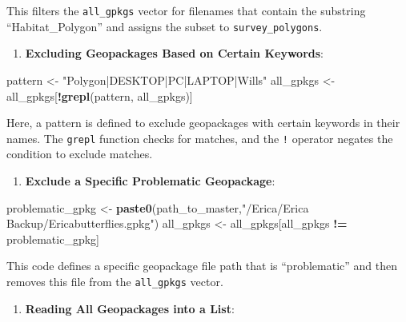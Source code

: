 \documentclass[
]{book}
\newenvironment{Shaded}{\begin{snugshade}}{\end{snugshade}}
\newcommand{\FunctionTok}[1]{\textcolor[rgb]{0.13,0.29,0.53}{\textbf{#1}}}
\newcommand{\NormalTok}[1]{#1}
\newcommand{\OtherTok}[1]{\textcolor[rgb]{0.56,0.35,0.01}{#1}}
\newcommand{\SpecialCharTok}[1]{\textcolor[rgb]{0.81,0.36,0.00}{\textbf{#1}}}
\newcommand{\StringTok}[1]{\textcolor[rgb]{0.31,0.60,0.02}{#1}}
\providecommand{\tightlist}{%
  \setlength{\itemsep}{0pt}\setlength{\parskip}{0pt}}
\theoremstyle{definition}
\theoremstyle{definition}
\theoremstyle{definition}
\theoremstyle{definition}
\theoremstyle{remark}
\begin{document}
This filters the \texttt{all\_gpkgs} vector for filenames that contain the substring ``Habitat\_Polygon'' and assigns the subset to \texttt{survey\_polygons}.

\begin{enumerate}
\def\labelenumi{\arabic{enumi}.}
\setcounter{enumi}{3}
\tightlist
\item
  \textbf{Excluding Geopackages Based on Certain Keywords}:
\end{enumerate}

\begin{Shaded}
\begin{Highlighting}[]
\NormalTok{   pattern }\OtherTok{\textless{}{-}} \StringTok{"Polygon|DESKTOP|PC|LAPTOP|Wills"}
\NormalTok{   all\_gpkgs }\OtherTok{\textless{}{-}}\NormalTok{ all\_gpkgs[}\SpecialCharTok{!}\FunctionTok{grepl}\NormalTok{(pattern, all\_gpkgs)]}
\end{Highlighting}
\end{Shaded}

Here, a pattern is defined to exclude geopackages with certain keywords in their names. The \texttt{grepl} function checks for matches, and the \texttt{!} operator negates the condition to exclude matches.

\begin{enumerate}
\def\labelenumi{\arabic{enumi}.}
\setcounter{enumi}{4}
\tightlist
\item
  \textbf{Exclude a Specific Problematic Geopackage}:
\end{enumerate}

\begin{Shaded}
\begin{Highlighting}[]
\NormalTok{   problematic\_gpkg }\OtherTok{\textless{}{-}} \FunctionTok{paste0}\NormalTok{(path\_to\_master,}\StringTok{"/Erica/Erica Backup/Ericabutterflies.gpkg"}\NormalTok{)}
\NormalTok{   all\_gpkgs }\OtherTok{\textless{}{-}}\NormalTok{ all\_gpkgs[all\_gpkgs }\SpecialCharTok{!=}\NormalTok{ problematic\_gpkg]}
\end{Highlighting}
\end{Shaded}

This code defines a specific geopackage file path that is ``problematic'' and then removes this file from the \texttt{all\_gpkgs} vector.

\begin{enumerate}
\def\labelenumi{\arabic{enumi}.}
\setcounter{enumi}{5}
\tightlist
\item
  \textbf{Reading All Geopackages into a List}:
\end{enumerate}
\end{document}

